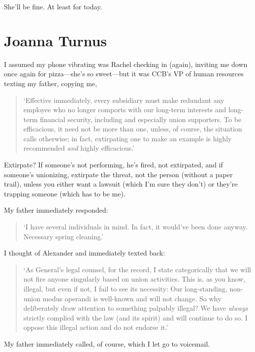 She'll be fine. At least for today.

\chapter{Joanna Turnus}

\titlemark

I assumed my phone vibrating was Rachel checking in (again), inviting me
down once again for pizza---she's so sweet---but it was CCB's VP of
human resources texting my father, copying me,

\begin{quote}
`Effective immediately, every subsidiary must make redundant any
employee who no longer comports with our long-term interests and
long-term financial security, including and especially union supporters.
To be efficacious, it need not be more than one, unless, of course, the
situation calls otherwise; in fact, extirpating one to make an example
is highly recommended \emph{and} highly efficacious.'
\end{quote}

Extirpate? If someone's not performing, he's fired, not extirpated, and
if someone's unionizing, extirpate the threat, not the person (without a
paper trail), unless you either want a lawsuit (which I'm sure they
don't) or they're trapping someone (which has to be me).

My father immediately responded:

\begin{quote}
`I have several individuals in mind. In fact, it would've been done
anyway. Necessary spring cleaning.'
\end{quote}

I thought of Alexander and immediately texted back:

\begin{quote}
`As General's legal counsel, for the record, I state categorically that
we will not fire anyone singularly based on union activities. This is,
as you know, illegal, but even if not, I fail to see its necessity: Our
long-standing, non-union modus operandi is well-known and will not
change. So why deliberately draw attention to something palpably
illegal? We have \emph{always} strictly complied with the law (and its
spirit) and will continue to do so. I oppose this illegal action and do
not endorse it.'
\end{quote}

My father immediately called, of course, which I let go to voicemail.

